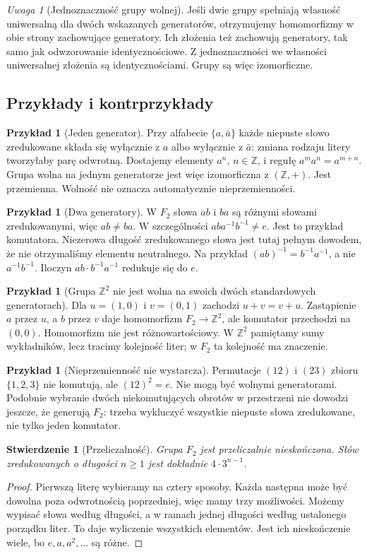 \documentclass[11pt,a4paper]{article}
\numberwithin{equation}{section}
\theoremstyle{plain}
\newtheorem{stwierdzenie}[twierdzenie]{Stwierdzenie}
\theoremstyle{definition}
\newtheorem{przyklad}[twierdzenie]{Przykład}
\theoremstyle{remark}
\newtheorem{uwaga}[twierdzenie]{Uwaga}
\newcommand{\Z}{\mathbb Z}
\begin{document}
\begin{uwaga}[Jednoznaczność grupy wolnej]
Jeśli dwie grupy spełniają własność uniwersalną dla dwóch wskazanych generatorów, otrzymujemy homomorfizmy w obie strony zachowujące generatory. Ich złożenia też zachowują generatory, tak samo jak odwzorowanie identycznościowe. Z jednoznaczności we własności uniwersalnej złożenia są identycznościami. Grupy są więc izomorficzne.
\end{uwaga}

\subsection{Przykłady i kontrprzykłady}
\begin{przyklad}[Jeden generator]
Przy alfabecie $\{a,\bar a\}$ każde niepuste słowo zredukowane składa się wyłącznie z $a$ albo wyłącznie z $\bar a$: zmiana rodzaju litery tworzyłaby parę odwrotną. Dostajemy elementy $a^n$, $n\in\Z$, i regułę $a^ma^n=a^{m+n}$. Grupa wolna na jednym generatorze jest więc izomorficzna z $(\Z,+)$. Jest przemienna. Wolność nie oznacza automatycznie nieprzemienności.
\end{przyklad}
\begin{przyklad}[Dwa generatory]
W $F_2$ słowa $ab$ i $ba$ są różnymi słowami zredukowanymi, więc $ab\ne ba$. W szczególności $aba^{-1}b^{-1}\ne e$. Jest to przykład komutatora. Niezerowa długość zredukowanego słowa jest tutaj pełnym dowodem, że nie otrzymaliśmy elementu neutralnego. Na przykład $(ab)^{-1}=b^{-1}a^{-1}$, a nie $a^{-1}b^{-1}$. Iloczyn $ab\cdot b^{-1}a^{-1}$ redukuje się do $e$.
\end{przyklad}
\begin{przyklad}[Grupa $\Z^2$ nie jest wolna na swoich dwóch standardowych generatorach]
Dla $u=(1,0)$ i $v=(0,1)$ zachodzi $u+v=v+u$. Zastąpienie $a$ przez $u$, a $b$ przez $v$ daje homomorfizm $F_2\to\Z^2$, ale komutator przechodzi na $(0,0)$. Homomorfizm nie jest różnowartościowy. W $\Z^2$ pamiętamy sumy wykładników, lecz tracimy kolejność liter; w $F_2$ ta kolejność ma znaczenie.
\end{przyklad}
\begin{przyklad}[Nieprzemienność nie wystarcza]
Permutacje $(12)$ i $(23)$ zbioru $\{1,2,3\}$ nie komutują, ale $(12)^2=e$. Nie mogą być wolnymi generatorami. Podobnie wybranie dwóch niekomutujących obrotów w przestrzeni nie dowodzi jeszcze, że generują $F_2$: trzeba wykluczyć wszystkie niepuste słowa zredukowane, nie tylko jeden komutator.
\end{przyklad}
\begin{stwierdzenie}[Przeliczalność]\label{st:przeliczalnosc-f2}
Grupa $F_2$ jest przeliczalnie nieskończona. Słów zredukowanych o długości $n\ge1$ jest dokładnie $4\cdot3^{n-1}$.
\end{stwierdzenie}
\begin{proof}
Pierwszą literę wybieramy na cztery sposoby. Każda następna może być dowolna poza odwrotnością poprzedniej, więc mamy trzy możliwości. Możemy wypisać słowa według długości, a w ramach jednej długości według ustalonego porządku liter. To daje wyliczenie wszystkich elementów. Jest ich nieskończenie wiele, bo $e,a,a^2,\ldots$ są różne.
\end{proof}
\end{document}
